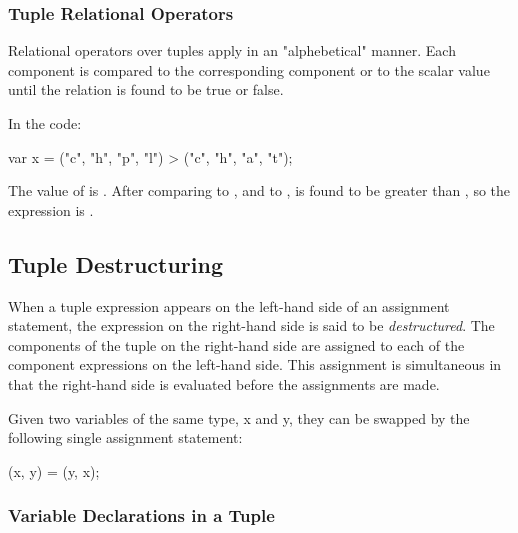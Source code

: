 \subsubsection{Tuple Relational Operators}
\label{Tuple_Relational_Operators}
Relational operators over tuples apply in an "alphebetical" manner.  Each
component is compared to the corresponding component or to the scalar
value until the relation is found to be true or false.
\begin{example}
In the code:
\begin{chapel}
var x = ("c", "h", "p", "l") > ("c", "h", "a", "t"); 
\end{chapel}
The value of  is . After comparing  to
, and  to ,  is found to be
greater than , so the expression is . 
\end{example}

\subsection{Tuple Destructuring}
\label{Tuple_Destructuring}

When a tuple expression appears on the left-hand side of an assignment
statement, the expression on the right-hand side is said to be {\em
destructured}.  The components of the tuple on the right-hand side are
assigned to each of the component expressions on the left-hand side.
This assignment is simultaneous in that the right-hand side is
evaluated before the assignments are made.
\begin{example}
Given two variables of the same type, x and y, they can be swapped by
the following single assignment statement:
\begin{chapel}
(x, y) = (y, x);
\end{chapel}
\end{example}

\subsubsection{Variable Declarations in a Tuple}
\label{Variable_Declarations_in_a_Tuple}

